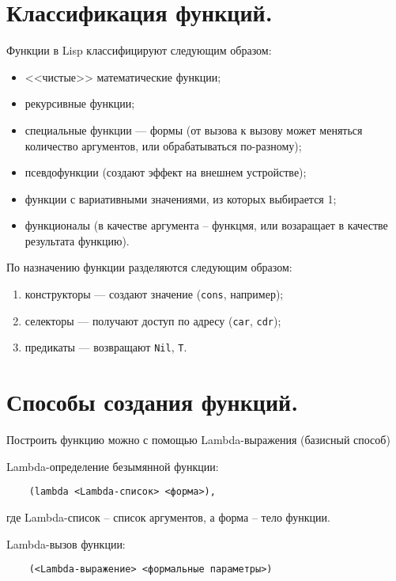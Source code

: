\section{Классификация функций.}

Функции в Lisp классифицируют следующим образом:

\begin{itemize}
    \item <<чистые>> математические функции;
    \item рекурсивные функции;
    \item специальные функции --- формы (от вызова к вызову может меняться количество аргументов, или обрабатываться по-разному);
    \item псевдофункции (создают эффект на внешнем устройстве);
    \item функции с вариативными значениями, из которых выбирается 1;
    \item функционалы (в качестве аргумента -- функцмя, или возаращает в качестве результата функцию).
\end{itemize}

По назначению функции разделяются следующим образом:

\begin{enumerate}
    \item конструкторы --- создают значение (\texttt{cons}, например);
    \item селекторы --- получают доступ по адресу (\texttt{car}, \texttt{cdr});
    \item предикаты --- возвращают \texttt{Nil}, \texttt{T}.
\end{enumerate}

\section{Способы создания функций.}

Построить функцию можно с помощью Lambda-выражения (базисный способ)

Lambda-определение безымянной функции:

\begin{lstlisting}
	(lambda <Lambda-список> <форма>),
\end{lstlisting}

где Lambda-список -- список аргументов, а форма -- тело функции.

Lambda-вызов функции:

\begin{lstlisting}
	(<Lambda-выражение> <формальные параметры>)
\end{lstlisting}

